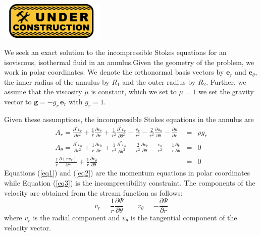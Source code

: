 
\includegraphics[width=5cm]{images/under_construction}


We seek an exact solution to the incompressible Stokes equations for an isoviscous, isothermal fluid in an  annulus.Given the geometry of the problem, we work in polar coordinates.
We denote the orthonormal basis vectors by $\mathbf{ e}_r$ and $\mathbf{ e}_\theta$, the inner radius of the annulus by $R_1$ and the outer radius by $R_2$.
Further, we assume that the viscosity $\mu$ is constant, which we set to $\mu = 1$ we set the gravity vector to $\mathbf{g} = -g_r \, \mathbf{e}_r$ with $g_r = 1$. 

Given these assumptions, the incompressible Stokes equations in the annulus are~\cite{scto01}
\begin{eqnarray}
A_r =     \frac{\partial^2 v_r}{\partial r^2} + \frac{1}{r} \frac{\partial v_r}{\partial r} +   
      \frac{1}{r^2} \frac{\partial^2 v_r}{\partial \theta^2}
    - \frac{v_r}{r^2} - \frac{2}{r^2} \frac{\partial u_\theta}{\partial \theta} 
-\frac{\partial p}{\partial r}  &=& \rho g_r \label{eq1} \\
A_\theta=
\frac{\partial^2 v_\theta}{\partial r^2} + \frac{1}{r} \frac{\partial v_\theta}{\partial r} + \frac{1}{r^2} \frac{\partial^2 v_\theta}{\partial \theta^2}
+\frac{2}{r^2} \frac{\partial v_r}{\partial \theta} - \frac{v_\theta}{r^2} 
-\frac{1}{r}\frac{\partial p}{\partial \theta} &=& 0
\label{eq2} \\
\frac{1}{r} \frac{\partial (rv_r)}{\partial r} + \frac{1}{r} \frac{\partial v_\theta}{\partial \theta} &=&0 \label{eq3}
\end{eqnarray}
Equations (\ref{eq1}) and (\ref{eq2}) are the momentum equations in polar coordinates while
Equation (\ref{eq3}) is the incompressibility constraint. 
The components of the velocity are obtained from the stream function as follows:
\[
v_r = \frac{1}{r}\frac{\partial \Psi}{\partial \theta}
\quad\quad
v_\theta = - \frac{\partial \Psi}{\partial r}
\]
where $v_r$ is the radial component and $v_\theta$ is the tangential component of the velocity vector.

